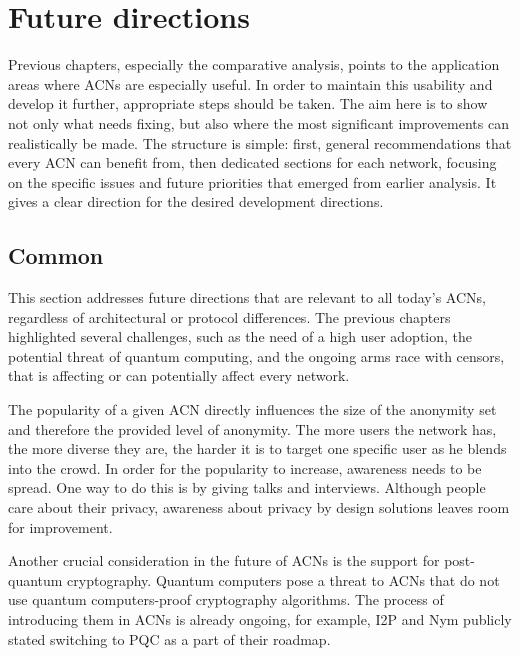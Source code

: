 \chapter{Future directions}
\label{chap:Future}

Previous chapters, especially the comparative analysis, points to the application areas where ACNs are especially useful. In order to maintain this usability and develop it further, appropriate steps should be taken. The aim here is to show not only what needs fixing, but also where the most significant improvements can realistically be made. The structure is simple: first, general recommendations that every ACN can benefit from, then dedicated sections for each network, focusing on the specific issues and future priorities that emerged from earlier analysis. It gives a clear direction for the desired development directions.

\section{Common}
This section addresses future directions that are relevant to all today's ACNs, regardless of architectural or protocol differences. The previous chapters highlighted several challenges, such as the need of a high user adoption, the potential threat of quantum computing, and the ongoing arms race with censors, that is affecting or can potentially affect every network.

The popularity of a given ACN directly influences the size of the anonymity set and therefore the provided level of anonymity. The more users the network has, the more diverse they are, the harder it is to target one specific user as he blends into the crowd. In order for the popularity to increase, awareness needs to be spread. One way to do this is by giving talks and interviews. Although people care about their privacy, awareness about privacy by design solutions leaves room for improvement.

Another crucial consideration in the future of ACNs is the support for post-quantum cryptography. Quantum computers pose a threat to ACNs that do not use quantum computers-proof cryptography algorithms. The process of introducing them in ACNs is already ongoing, for example, I2P and Nym publicly stated switching to PQC as a part of their roadmap.


